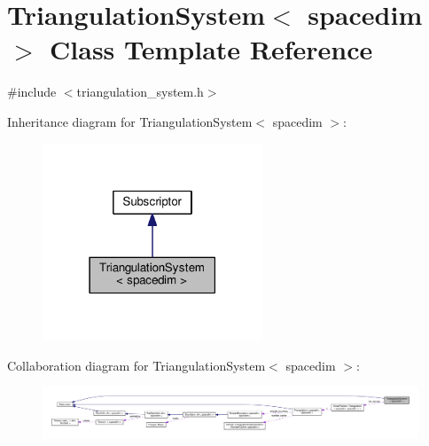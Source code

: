 \hypertarget{class_triangulation_system}{}\section{Triangulation\+System$<$ spacedim $>$ Class Template Reference}
\label{class_triangulation_system}


{\ttfamily \#include $<$triangulation\+\_\+system.\+h$>$}



Inheritance diagram for Triangulation\+System$<$ spacedim $>$\+:
\nopagebreak
\begin{figure}[H]
\begin{center}
\leavevmode
\includegraphics[width=186pt]{class_triangulation_system__inherit__graph}
\end{center}
\end{figure}


Collaboration diagram for Triangulation\+System$<$ spacedim $>$\+:
\nopagebreak
\begin{figure}[H]
\begin{center}
\leavevmode
\includegraphics[width=350pt]{class_triangulation_system__coll__graph}
\end{center}
\end{figure}
